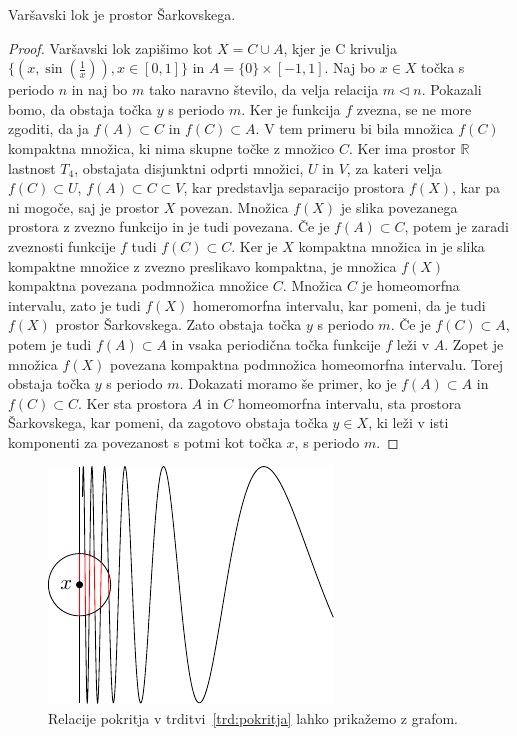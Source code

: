 \documentclass[mat2]{fmfdelo}
\newcommand{\R}{\mathbb R}
\begin{document}
\begin{trditev}
Varšavski lok je prostor Šarkovskega.
\end{trditev}
\begin{proof}
Varšavski lok zapišimo kot $X = C \cup A$, kjer je C krivulja $\{(x, \sin(\frac{1}{x})), x\in [0, 1]\}$ in $A= \{0\} \times [-1, 1]$. Naj bo $x \in X$ točka s periodo $n$ in naj bo $m$ tako naravno število, da velja relacija $m \triangleleft n$. Pokazali bomo, da obstaja točka $y$ s periodo $m$. Ker je funkcija $f$ zvezna, se ne more zgoditi, da ja $f(A) \subset C$ in $f(C) \subset A$. V tem primeru bi bila množica $f(C)$ kompaktna množica, ki nima skupne točke z množico $C$. Ker ima prostor $\R$ lastnost $T_4$, obstajata disjunktni odprti množici, $U$ in $V$, za kateri velja $f(C) \subset U$, $f(A) \subset C \subset V$, kar predstavlja separacijo prostora $f(X)$, kar pa ni mogoče, saj je prostor $X$ povezan. Množica $f(X)$ je slika povezanega prostora z zvezno funkcijo in je tudi povezana. Če je $f(A) \subset C$, potem je zaradi zveznosti funkcije $f$ tudi $f(C) \subset C$. Ker je $X$ kompaktna množica in je slika kompaktne množice z zvezno preslikavo kompaktna, je množica $f(X)$ kompaktna povezana podmnožica množice $C$. Množica $C$ je homeomorfna intervalu, zato je tudi $f(X)$ homeromorfna intervalu, kar pomeni, da je tudi $f(X)$ prostor Šarkovskega. Zato obstaja točka $y$ s periodo $m$. Če je $f (C) \subset A $, potem je tudi $f (A) \subset A $ in vsaka periodična točka funkcije $f$ leži v $A$.  Zopet je množica $f(X)$ povezana kompaktna podmnožica homeomorfna intervalu. Torej obstaja točka $y$ s periodo $m$. 
Dokazati moramo še primer, ko je $f (A) \subset A $ in $f (C) \subset C $. Ker sta prostora $A$ in $C$ homeomorfna intervalu, sta prostora Šarkovskega, kar pomeni, da zagotovo obstaja točka $y \in X$, ki leži v isti komponenti za povezanost s potmi kot točka $x$, s periodo $m$.
\end{proof}

\begin{figure}[h]
  \centering
  \includegraphics{images/varsavskilok.pdf}
  \caption[Primer vektorske slike.]{Relacije pokritja v trditvi~\ref{trd:pokritja} lahko prikažemo z grafom.}
  \label{fig:varsavski_lok}
\end{figure}
\end{document}
